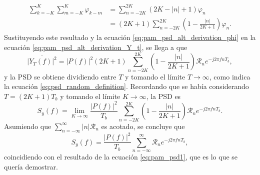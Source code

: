\documentclass[a4paper]{article}
\begin{document}
\begin{align*}
 \sum_{k=-K}^{K}\sum_{m=-K}^{K}\varphi_{k-m}&=\sum_{n=-2K}^{2K}(2K-|n|+1)\varphi_n\\
   &=(2K+1)\sum_{n=-2K}^{2K}\left(1-\frac{|n|}{2K+1}\right)\varphi_n.
\end{align*}
Sustituyendo este resultado y la ecuación \ref{eq:pam_psd_alt_derivation_phi} en la ecuación \ref{eq:pam_psd_alt_derivation_Y_t}, se llega a que
\[
 \overline{|Y_T(f)|^2}=|P(f)|^2(2K+1)\sum_{n=-2K}^{2K}\left(1-\frac{|n|}{2K+1}\right)\mathcal{R}_{n}e^{-j2\pi fnT_b},
\]
y la PSD se obtiene dividiendo entre \(T\) y tomando el límite \(T\to\infty\), como indica la ecuación \ref{eq:psd_random_definition}. Recordando que se había considerando \(T=(2K+1)T_b\) y tomando el límite \(K\to\infty\), la PSD es
\[
 S_y(f)=\lim_{K\to\infty}\frac{|P(f)|^2}{T_b}\sum_{n=-2K}^{2K}\left(1-\frac{|n|}{2K+1}\right)\mathcal{R}_{n}e^{-j2\pi fnT_b}.
\]
Asumiendo que \(\sum_{n=-\infty}^{\infty}|n|\mathcal{R}_n\) es acotado, se concluye que
\[
 S_y(f)=\frac{|P(f)|^2}{T_b}\sum_{n=-\infty}^{\infty}\mathcal{R}_{n}e^{-j2\pi fnT_b},
\]
coincidiendo con el resultado de la ecuación \ref{eq:pam_psd1}, que es lo que se quería demostrar.
 


\end{document}
